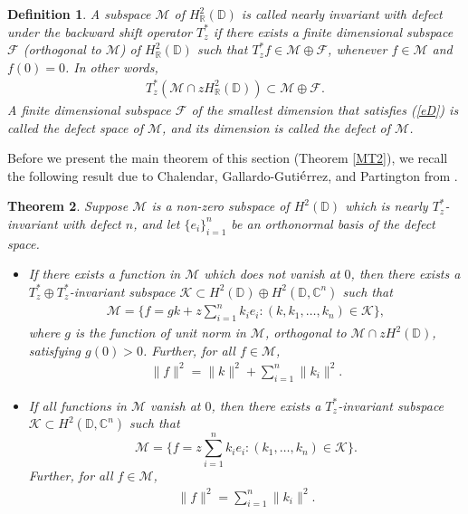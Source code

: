 \documentclass[11pt]{amsart}
\newtheorem{theorem}{Theorem}[section]
\newtheorem{definition}[theorem]{Definition}
\numberwithin{equation}{section}
\begin{document}
\begin{definition}\label{defD}
 A subspace $\mathcal{M}$ of $H^2_{\mathbb{R}}(\mathbb{D})$ is called nearly invariant with defect under the backward shift operator $T^*_z$ if there exists a finite dimensional subspace $\mathcal{F}$ (orthogonal to $\mathcal{M}$) of $H^2_{\mathbb{R}}(\mathbb{D})$ such that $T^*_zf \in \mathcal{M} \oplus \mathcal{F}$, whenever $f \in \mathcal{M}$ and $f(0)=0$. In other words, 
 \begin{eqnarray} \label{eD}
     T^*_z(\mathcal{M}\cap zH^2_{\mathbb{R}}(\mathbb{D}))\subset \mathcal{M} \oplus \mathcal{F}.
 \end{eqnarray}
A finite dimensional subspace $\mathcal{F}$ of the smallest dimension that satisfies (\ref{eD}) is called the \textit{defect space} of $\mathcal{M}$, and its dimension is called the \textit{defect} of $\mathcal{M}$. 
\end{definition}


\textnormal{Before we present the main theorem of this section (Theorem \ref{MT2}), we recall the following result due to Chalendar, Gallardo-Guti$\rm{\acute{e}}$rrez, and Partington from \cite{CGP1}.}


\begin{theorem}\cite[Theorem 3.2]{CGP1}\label{CGP}
Suppose $\mathcal{M}$ is a non-zero subspace of $H^2(\mathbb{D})$ which is nearly $T^*_z$-invariant with defect $n$, and let $\{e_i\}_{i=1}^{n}$ be an orthonormal basis of the defect space.
\begin{itemize}
    \item[(i)] If there exists a function in $\mathcal{M}$ which does not vanish at $0$, then there exists a $T^*_z\oplus T^*_z$-invariant subspace $\mathcal{K}\subset H^2(\mathbb{D}) \oplus H^2(\mathbb{D},\mathbb{C}^n)$ such that
\begin{eqnarray*}
    \mathcal{M}=\Big\{f=gk + z\sum_{i=1}^{n}k_ie_i : (k,k_1,\dots , k_n)\in \mathcal{K}\Big\},
\end{eqnarray*}
where $g$ is the function of unit norm in $\mathcal{M}$, orthogonal to $\mathcal{M}\cap zH^2(\mathbb{D})$, satisfying $g(0)>0$. Further, for all $f\in \mathcal{M}$,
\begin{eqnarray*}
\|f\|^2=\|k\|^2 +\sum_{i=1}^{n} \|k_i\|^2.
\end{eqnarray*}

\item[(ii)] If all functions in $\mathcal{M}$ vanish at $0$, then there exists a $T^*_z$-invariant subspace $\mathcal{K}\subset H^2(\mathbb{D},\mathbb{C}^n)$ such that
$$\mathcal{M}=\Big\{f=z\sum_{i=1}^{n}k_ie_i : (k_1,\dots, k_n)\in \mathcal{K}\Big\}.$$
 Further, for all $f \in \mathcal{M}$,
\begin{eqnarray*}
    \|f\|^2=\sum_{i=1}^{n}\|k_i\|^2.
\end{eqnarray*}
\end{itemize}

\end{theorem}
\end{document}
